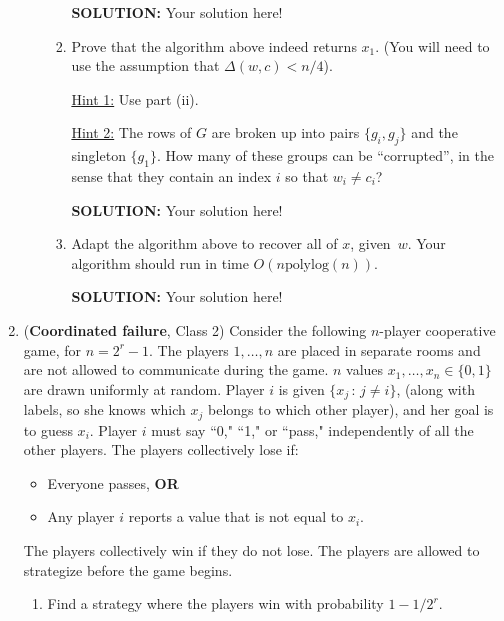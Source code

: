 \documentclass{article}
\begin{document}
\begin{enumerate}
\begin{enumerate}
\begin{enumerate}
\begin{shaded}
\textbf{SOLUTION:}
Your solution here!
\end{shaded}


\item Prove that the algorithm above indeed returns $x_1$.  (You will need to use the assumption that $\Delta(w,c) < n/4$).  

\underline{Hint 1:} Use part (ii).

\underline{Hint 2:} The rows of $G$ are broken up into pairs $\{g_i, g_j\}$ and the singleton $\{g_1\}$.  How many of these groups can be ``corrupted'', in the sense that they contain an index $i$ so that $w_i \neq c_i$? 

\begin{shaded}
\textbf{SOLUTION:}
Your solution here!
\end{shaded}


\item Adapt the algorithm above to recover all of $x$, given~$w$.  Your algorithm should run in time $O(n \mathrm{polylog}(n))$.

\begin{shaded}
\textbf{SOLUTION:}
Your solution here!
\end{shaded}

\end{enumerate}

\end{enumerate}



\item (\textbf{Coordinated failure}, Class 2) Consider the following $n$-player cooperative game, for $n = 2^r - 1$.   The players $1,\ldots,n$ are placed in separate rooms and are not allowed to communicate during the game.
$n$ values $x_1,\ldots,x_n \in \{0,1\}$ are drawn uniformly at random.
Player $i$ is given $\{ x_j \,:\, j \neq i \}$, (along with labels, so she knows which $x_j$ belongs to which other player), and her goal is to guess $x_i$.  Player $i$ must say ``0," ``1," or ``pass," independently of all the other players.
The players collectively lose if:
\begin{itemize}
	\item Everyone passes, \textbf{OR}
	\item Any player $i$ reports a value that is not equal to $x_i$.
\end{itemize} 
The players collectively win if they do not lose.
The players are allowed to strategize before the game begins.  
\begin{enumerate}
\item Find a strategy where the players win with probability $1 - 1/2^r$. 


\end{enumerate}
\end{enumerate}
\end{document}
